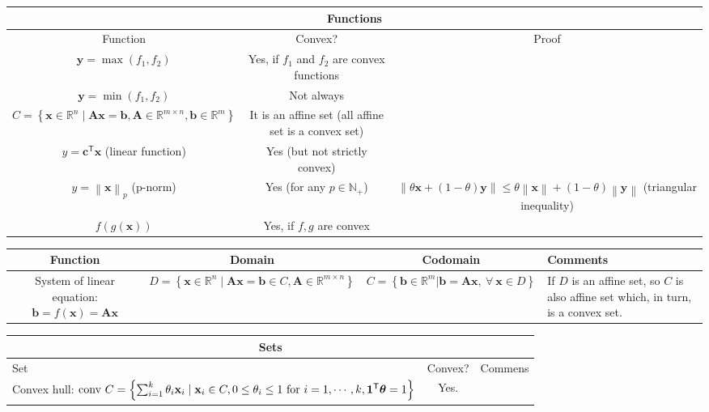 \documentclass{article}
\newcommand{\trans}{\mathsf{T}}
\newcommand\norm[1]{\left\lVert#1\right\rVert}
\begin{document}
\begin{landscape}
    \vspace{-10ex}
    \begin{table}
        \centering
    \begin{tabular}{||c | c | c||}
        \hline
        \multicolumn{3}{|c|}{Functions} \\
        \hline
        Function & Convex? & Proof \\ [0.5ex] 
        \hline\hline
        $\mathbf{y} = \max(f_1, f_2)$ & Yes, if $f_1$ and $f_2$ are convex functions & \\
        \hline
        $\mathbf{y} = \min(f_1, f_2)$ & Not always & \\
        \hline
        $C = \left\{ \mathbf{x} \in \mathbb{R}^{n} \mid \mathbf{Ax} = \mathbf{b}, \mathbf{A} \in \mathbb{R}^{m \times n}, \mathbf{b} \in \mathbb{R}^{m} \right\}$ & It is an affine set (all affine set is a convex set)  & \\
        \hline
        $y = \mathbf{c}^\trans \mathbf{x}$ (linear function) & Yes (but not strictly convex) & \\
        \hline
        $y = \norm{\mathbf{x}}_p $ (p-norm) & Yes (for any $p \in \mathbb{N}_+$) & $\norm{\theta\mathbf{x} + (1-\theta)\mathbf{y}} \leq \theta\norm{\mathbf{x}} + (1-\theta)\norm{\mathbf{y}}$ (triangular inequality) \\
        \hline
        $f(g(\mathbf{x}))$ & Yes, if $f, g$ are convex & \\
        \hline
    \end{tabular}
    \begin{tabular}{|c|c|c|p{5cm}|}
        Function & Domain & Codomain & Comments \\
        \hline
        System of linear equation: $\mathbf{b} = f(\mathbf{x}) = \mathbf{Ax}$ & $D = \left\{ \mathbf{x} \in \mathbb{R}^{n} \mid \mathbf{Ax} = \mathbf{b} \in C, \mathbf{A} \in \mathbb{R}^{m \times n} \right\}$ & $C = \left\{ \mathbf{b} \in \mathbb{R}^{m} | \mathbf{b} = \mathbf{Ax},\: \forall\: \mathbf{x} \in D  \right\}$ & If $D$ is an affine set, so $C$ is also affine set which, in turn, is a convex set. \\ \hline
    \end{tabular}
    \begin{tabular}{|l|c|p{7cm}|}
        \hline
        \multicolumn{3}{|c|}{Sets}\\
        \hline
        Set & Convex? & Commens\\
        \hline
        \makecell{Convex hull: \\ $\textnormal{conv } C = \left\{ \sum_{i=1}^{k} \theta_i\mathbf{x}_i \mid \mathbf{x}_i \in C, 0 \le \theta_i \le 1 \textnormal{ for } i=1,\cdots, k, \mathbf{1}^\trans\boldsymbol{\theta} = 1  \right\}$} & Yes. & \begin{itemize}[leftmargin=*]

\end{itemize}
\end{tabular}
\end{table}
\end{landscape}
\end{document}

